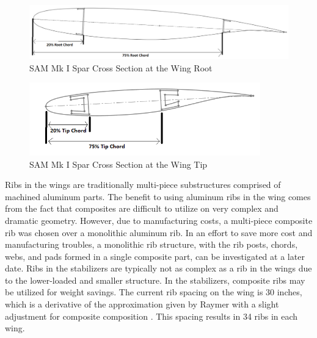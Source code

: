 \begin{figure}[!h]
    \centering
    \includegraphics[width=\linewidth]{Photos/structuresandloads/Spar Layout.PNG}
    \caption{SAM Mk I Spar Cross Section at the Wing Root}
    \label{fig:spar_layout}
\end{figure}
\begin{figure}[!h]
    \centering
    \includegraphics[width=10cm]{Photos/structuresandloads/Spar Layout Tip.PNG}
    \caption{SAM Mk I Spar Cross Section at the Wing Tip}
    \label{fig:spar_layout_tip}
\end{figure}

Ribs in the wings are traditionally multi-piece substructures comprised of machined aluminum parts. The benefit to using aluminum ribs in the wing comes from the fact that composites are difficult to utilize on very complex and dramatic geometry. However, due to manufacturing costs, a multi-piece composite rib was chosen over a monolithic aluminum rib. In an effort to save more cost and manufacturing troubles, a monolithic rib structure, with the rib posts, chords, webs, and pads formed in a single composite part, can be investigated at a later date. Ribs in the stabilizers are typically not as complex as a rib in the wings due to the lower-loaded and smaller structure. In the stabilizers, composite ribs may be utilized for weight savings. The current rib spacing on the wing is 30 inches, which is a derivative of the approximation given by Raymer with a slight adjustment for composite composition \cite{raymer}. This spacing results in 34 ribs in each wing. 

